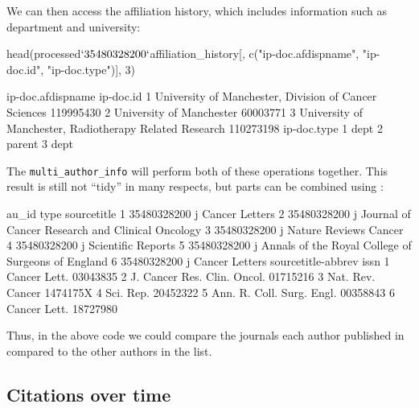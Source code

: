 We can then access the affiliation history, which includes information
such as department and university:

\begin{Schunk}
\begin{Sinput}
head(processed$`35480328200`$affiliation_history[, c("ip-doc.afdispname", "ip-doc.id", "ip-doc.type")], 3)
\end{Sinput}
\begin{Soutput}
                                        ip-doc.afdispname ip-doc.id
1   University of Manchester, Division of Cancer Sciences 119995430
2                                University of Manchester  60003771
3 University of Manchester, Radiotherapy Related Research 110273198
  ip-doc.type
1        dept
2      parent
3        dept
\end{Soutput}
\end{Schunk}

The \texttt{multi\_author\_info} will perform both of these operations
together. This result is still not ``tidy'' \citep{wickham2014tidy} in
many respects, but parts can be combined using 
\citep{purrr}:

\begin{Schunk}
\begin{Soutput}
        au_id type                                        sourcetitle
1 35480328200    j                                     Cancer Letters
2 35480328200    j   Journal of Cancer Research and Clinical Oncology
3 35480328200    j                              Nature Reviews Cancer
4 35480328200    j                                 Scientific Reports
5 35480328200    j Annals of the Royal College of Surgeons of England
6 35480328200    j                                     Cancer Letters
           sourcetitle-abbrev     issn
1                Cancer Lett. 03043835
2 J. Cancer Res. Clin. Oncol. 01715216
3            Nat. Rev. Cancer 1474175X
4                   Sci. Rep. 20452322
5   Ann. R. Coll. Surg. Engl. 00358843
6                Cancer Lett. 18727980
\end{Soutput}
\end{Schunk}

Thus, in the above code we could compare the journals each author
published in compared to the other authors in the list.

\hypertarget{citations-over-time}{%
\subsection{Citations over time}\label{citations-over-time}}

